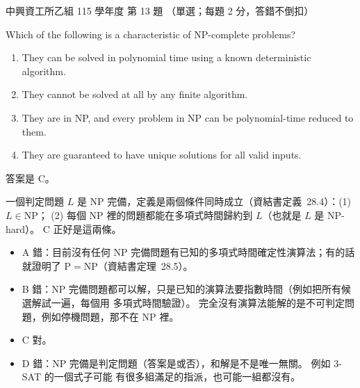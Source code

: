 \begin{pastexam}[label={px:nchu-115-is-13}]{中興資工所乙組 115 學年度 第 13 題}
（單選；每題 2 分，答錯不倒扣）

Which of the following is a characteristic of NP-complete problems?
\begin{enumerate}[label=\Alph*.,nosep]
\item They can be solved in polynomial time using a known deterministic algorithm.
\item They cannot be solved at all by any finite algorithm.
\item They are in NP, and every problem in NP can be polynomial-time reduced to them.
\item They are guaranteed to have unique solutions for all valid inputs.
\end{enumerate}
\end{pastexam}

\begin{pastsoln}
答案是 C。

一個判定問題 $L$ 是 NP 完備，定義是兩個條件同時成立（資結書定義~28.4）：(1) $L \in \mathrm{NP}$；
(2) 每個 NP 裡的問題都能在多項式時間歸約到 $L$（也就是 $L$ 是 NP-hard）。 C 正好是這兩條。
\begin{itemize}
\item A 錯：目前沒有任何 NP 完備問題有已知的多項式時間確定性演算法；有的話就證明了
$\mathrm{P} = \mathrm{NP}$（資結書定理~28.5）。
\item B 錯：NP 完備問題都可以解，只是已知的演算法要指數時間（例如把所有候選解試一遍，每個用
多項式時間驗證）。 完全沒有演算法能解的是不可判定問題，例如停機問題，那不在 NP 裡。
\item C 對。
\item D 錯：NP 完備是判定問題（答案是或否），和解是不是唯一無關。 例如 3-SAT 的一個式子可能
有很多組滿足的指派，也可能一組都沒有。
\end{itemize}
\end{pastsoln}
